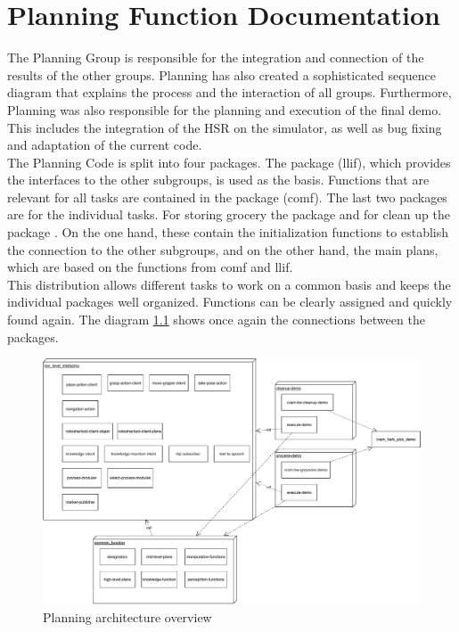 \documentclass[main.tex]{subfiles}
\begin{document}
	\begingroup

	\renewcommand{\cleardoublepage}{}

	\renewcommand{\clearpage}{}
	
	\newpage

	\chapter{Planning Function Documentation}

		
		The Planning Group is responsible for the integration and connection of the results of the other groups. Planning has also created a sophisticated sequence diagram that explains the process and the interaction of all groups.
	    Furthermore, Planning was also responsible for the planning and execution of the final demo. This includes the integration of the HSR on the simulator, as well as bug fixing and adaptation of the current code. \\
			
			The Planning Code is split into four packages. The package  (llif), which provides the interfaces to the other subgroups, is used as the basis. Functions that are relevant for all tasks are contained in the package  (comf). The last two packages are for the individual tasks. For storing grocery the package  and for clean up the package . On the one hand, these contain the initialization functions to establish the connection to the other subgroups, and on the other hand, the main plans, which are based on the functions from comf and llif. \\
			This distribution allows different tasks to work on a common basis and keeps the individual packages well organized. Functions can be clearly assigned and quickly found again. The diagram \ref{planning-overview} shows once again the connections between the packages.

		\begin{figure}[H]
			\centering
			\includegraphics[width=\textwidth]{pictures/diagramms/planning.pdf}
			\caption{Planning architecture overview}
			\label{planning-overview}
		\end{figure}
		
\end{document}
